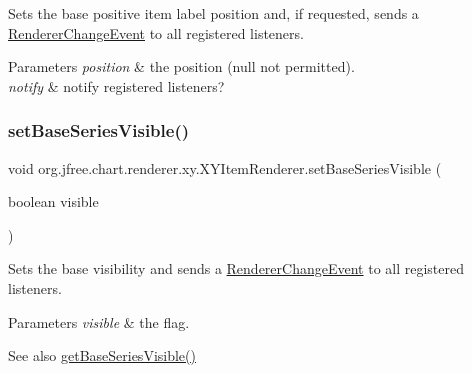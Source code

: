 Sets the base positive item label position and, if requested, sends a \mbox{\hyperlink{}{Renderer\+Change\+Event}} to all registered listeners.


\begin{DoxyParams}{Parameters}
{\em position} & the position ({\ttfamily null} not permitted). \\
\hline
{\em notify} & notify registered listeners? \\
\hline
\end{DoxyParams}
\mbox{\label{interfaceorg_1_1jfree_1_1chart_1_1renderer_1_1xy_1_1_x_y_item_renderer_a223f697346a47561ead7d43ebdb9fb84}} 
\subsubsection{\texorpdfstring{set\+Base\+Series\+Visible()}{setBaseSeriesVisible()}\hspace{0.1cm}{\footnotesize\ttfamily [1/2]}}
{\footnotesize\ttfamily void org.\+jfree.\+chart.\+renderer.\+xy.\+X\+Y\+Item\+Renderer.\+set\+Base\+Series\+Visible (\begin{DoxyParamCaption}\item[{boolean}]{visible }\end{DoxyParamCaption})}

Sets the base visibility and sends a \mbox{\hyperlink{}{Renderer\+Change\+Event}} to all registered listeners.


\begin{DoxyParams}{Parameters}
{\em visible} & the flag.\\
\hline
\end{DoxyParams}
\begin{DoxySeeAlso}{See also}
\mbox{\hyperlink{interfaceorg_1_1jfree_1_1chart_1_1renderer_1_1xy_1_1_x_y_item_renderer_a7703af7b787a8cc46ec822c840e2f79c}{get\+Base\+Series\+Visible()}} 
\end{DoxySeeAlso}
\mbox{\label{interfaceorg_1_1jfree_1_1chart_1_1renderer_1_1xy_1_1_x_y_item_renderer_aba42a9e2002f1602b4ae35029adc6181}} 
